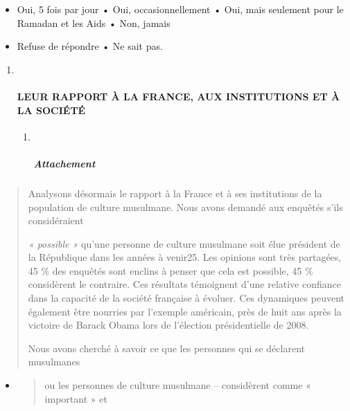 \begin{itemize}
\item
  Oui, 5 fois par jour • Oui, occasionnellement • Oui, mais seulement
  pour le Ramadan et les Aids • Non, jamais
\item
  Refuse de répondre • Ne sait pas.
\end{itemize}

\begin{quote}

\end{quote}

\begin{enumerate}
\def\labelenumi{\arabic{enumi}.}
\item ~
  \hypertarget{leur-rapport-uxe0-la-france-aux-institutions-et-uxe0-la-sociuxe9tuxe9}{%
  \paragraph{LEUR RAPPORT À LA FRANCE, AUX INSTITUTIONS ET À LA
  SOCIÉTÉ}\label{leur-rapport-uxe0-la-france-aux-institutions-et-uxe0-la-sociuxe9tuxe9}}

  \begin{enumerate}
  \def\labelenumii{\arabic{enumii}.}
  \item ~
    \hypertarget{attachement}{%
    \subparagraph{Attachement}\label{attachement}}
  \end{enumerate}
\end{enumerate}

\begin{quote}
Analysons désormais le rapport à la France et à ses institutions de la
population de culture musulmane. Nous avons demandé aux enquêtés s'ils
considéraient

\emph{« possible »} qu'une personne de culture musulmane soit élue
président de la République dans les années à venir25. Les opinions sont
très partagées, 45 \% des enquêtés sont enclins à penser que cela est
possible, 45 \% considèrent le contraire. Ces résultats témoignent d'une
relative confiance dans la capacité de la société française à évoluer.
Ces dynamiques peuvent également être nourries par l'exemple américain,
près de huit ans après la victoire de Barack Obama lors de l'élection
présidentielle de 2008.

Nous avons cherché à savoir ce que les personnes qui se déclarent
musulmanes
\end{quote}

\begin{itemize}
\item
  \begin{quote}
  ou les personnes de culture musulmane -- considèrent comme « important
  » et
  \end{quote}
\end{itemize}

